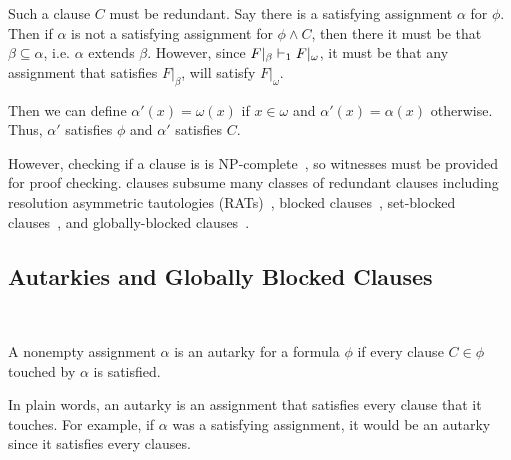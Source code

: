 Such a clause $C$ must be redundant. Say there is a satisfying assignment $\alpha$ for $\phi$. Then if $\alpha$ is not a satisfying assignment for $\phi \land C$, then there it must be that $\beta \subseteq \alpha$, i.e. $\alpha$ extends $\beta$. However, since $F|_\beta \vdash_1 F|_\omega$, it must be that any assignment that satisfies $F|_\beta$, will satisfy $F|_\omega$. 

Then we can define $\alpha' (x) = \omega(x)$ if $x \in \omega$ and $\alpha'(x) = \alpha(x)$ otherwise. Thus, $\alpha'$ satisfies $\phi$ and $\alpha'$ satisfies $C$.




However, checking if a clause is \pr is NP-complete~\cite{prclause}, so witnesses must be provided for proof checking. \pr clauses subsume many classes of redundant clauses including resolution asymmetric tautologies (RATs)~\cite{rat}, blocked clauses~\cite{blockedclause}, set-blocked clauses~\cite{setblocked}, and globally-blocked clauses~\cite{conditionalautarkies}.

\subsection{Autarkies and Globally Blocked Clauses}~\label{subsec:autarkies}


\begin{definition}[Autarky]
    A nonempty assignment $\alpha$ is an autarky for a formula $\phi$ if every clause $C \in \phi$ touched by $\alpha$ is satisfied.
\end{definition}


In plain words, an autarky is an assignment that satisfies every clause that it touches. For example, if $\alpha$ was a satisfying assignment, it would be an autarky since it satisfies every clauses.

